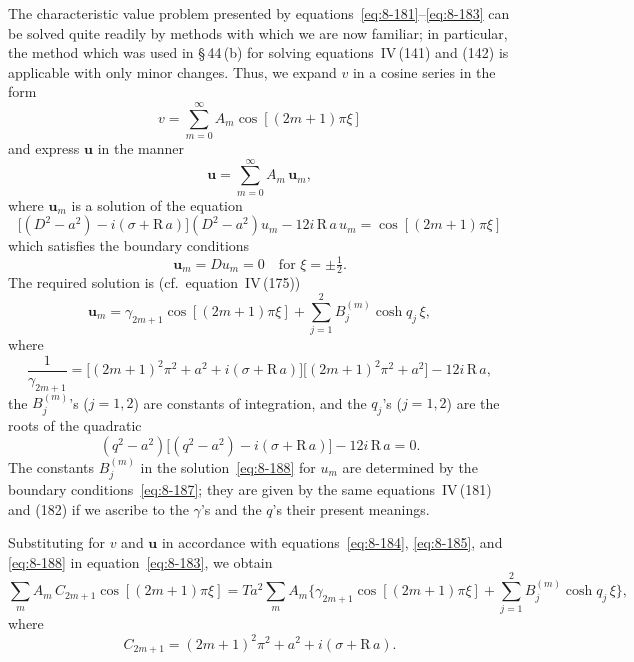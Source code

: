 The characteristic value problem presented by equations~\eqref{eq:8-181}--\eqref{eq:8-183} can be solved quite readily by methods with which we are now familiar; in particular, the method which was used in \S\,44\,(b) for solving equations~IV\,(141) and (142) is applicable with only minor changes. Thus, we expand $v$ in a cosine series in the form
\begin{equation}
\label{eq:8-184}
v = \sum_{m=0}^{\infty} A_m\cos[(2m+1)\pi\xi]
\end{equation}
and express $\mathbf{u}$ in the manner
\begin{equation}
\label{eq:8-185}
\mathbf{u} = \sum_{m=0}^{\infty} A_m\,\mathbf{u}_m,
\end{equation}
where $\mathbf{u}_m$ is a solution of the equation
\begin{equation}
\label{eq:8-186}
\bigl[(D^2-a^2) - i(\sigma + \mathrm{R}\,a)\bigr](D^2-a^2)u_m - 12i\,\mathrm{R}\,a\,u_m = \cos[(2m+1)\pi\xi]
\end{equation}
which satisfies the boundary conditions
\begin{equation}
\label{eq:8-187}
\mathbf{u}_m = Du_m = 0 \quad \text{for } \xi = \pm\tfrac{1}{2}.
\end{equation}
The required solution is (cf.\ equation~IV\,(175))
\begin{equation}
\label{eq:8-188}
\mathbf{u}_m = \gamma_{2m+1}\cos[(2m+1)\pi\xi] + \sum_{j=1}^{2} B_j^{(m)}\cosh q_j\,\xi,
\end{equation}
where
\begin{equation}
\label{eq:8-189}
\frac{1}{\gamma_{2m+1}} = \bigl[(2m+1)^2\pi^2 + a^2 + i(\sigma + \mathrm{R}\,a)\bigr]\bigl[(2m+1)^2\pi^2 + a^2\bigr] - 12i\,\mathrm{R}\,a,
\end{equation}
the $B_j^{(m)}$'s ($j = 1,2$) are constants of integration, and the $q_j$'s ($j = 1,2$) are the roots of the quadratic
\begin{equation}
\label{eq:8-190}
(q^2 - a^2)\bigl[(q^2-a^2) - i(\sigma + \mathrm{R}\,a)\bigr] - 12i\,\mathrm{R}\,a = 0.
\end{equation}
The constants $B_j^{(m)}$ in the solution~\eqref{eq:8-188} for $u_m$ are determined by the boundary conditions~\eqref{eq:8-187}; they are given by the same equations~IV\,(181) and (182) if we ascribe to the $\gamma$'s and the $q$'s their present meanings.

Substituting for $v$ and $\mathbf{u}$ in accordance with equations~\eqref{eq:8-184}, \eqref{eq:8-185}, and \eqref{eq:8-188} in equation~\eqref{eq:8-183}, we obtain
\begin{equation}
\label{eq:8-191}
\sum_m A_m\,C_{2m+1}\cos[(2m+1)\pi\xi] = Ta^2\sum_m A_m\bigl\{\gamma_{2m+1}\cos[(2m+1)\pi\xi] + \sum_{j=1}^{2} B_j^{(m)}\cosh q_j\,\xi\bigr\},
\end{equation}
where
\begin{equation}
\label{eq:8-192}
C_{2m+1} = (2m+1)^2\pi^2 + a^2 + i(\sigma + \mathrm{R}\,a).
\end{equation}

